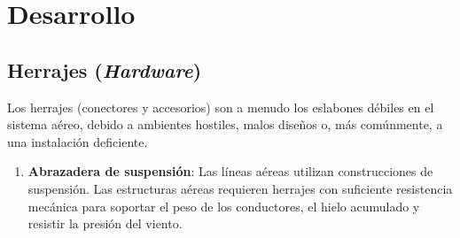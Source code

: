 \section*{Desarrollo}

\subsection*{Herrajes (\textit{Hardware})}
Los herrajes (conectores y accesorios) son a menudo los eslabones débiles en el sistema aéreo, debido a ambientes hostiles, malos diseños o, más comúnmente, a una instalación deficiente.

\begin{enumerate}
    \item \textbf{Abrazadera de suspensión}: Las líneas aéreas utilizan construcciones de suspensión. Las estructuras aéreas requieren herrajes con suficiente resistencia mecánica para soportar el peso de los conductores, el hielo acumulado y resistir la presión del viento.




\end{enumerate}
